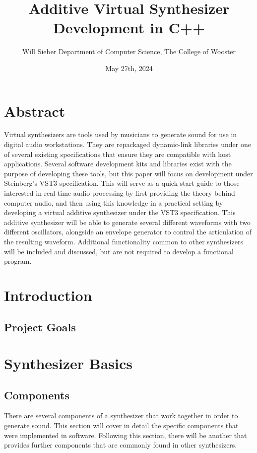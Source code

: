 \documentclass[12pt]{article}
\title{Additive Virtual Synthesizer Development in C++}
\date{May 27th, 2024}
\author{\parbox{\linewidth}{\centering%
	Will Sieber
	\endgraf\bigskip
	Department of Computer Science, The College of Wooster
	\bigskip
}}
\begin{document}
\maketitle

\newpage
\tableofcontents

\section{Abstract}
Virtual synthesizers are tools used by musicians to generate sound for use in digital audio workstations. They are repackaged dynamic-link libraries under one of several existing specifications that ensure they are compatible with host applications. Several software development kits and libraries exist with the purpose of developing these tools, but this paper will focus on development under Steinberg's VST3 specification. This will serve as a quick-start guide to those interested in real time audio processing by first providing the theory behind computer audio, and then using this knowledge in a practical setting by developing a virtual additive synthesizer under the VST3 specification. This additive synthesizer will be able to generate several different waveforms with two different oscillators, alongside an envelope generator to control the articulation of the resulting waveform. Additional functionality common to other synthesizers will be included and discussed, but are not required to develop a functional program.
\newpage

\section{Introduction}

\subsection{Project Goals}

\section{Synthesizer Basics}

\subsection{Components}
There are several components of a synthesizer that work together in order to generate sound. This section will cover in detail the specific components that were implemented in software. Following this section, there will be another that provides further components that are commonly found in other synthesizers.
\end{document}
